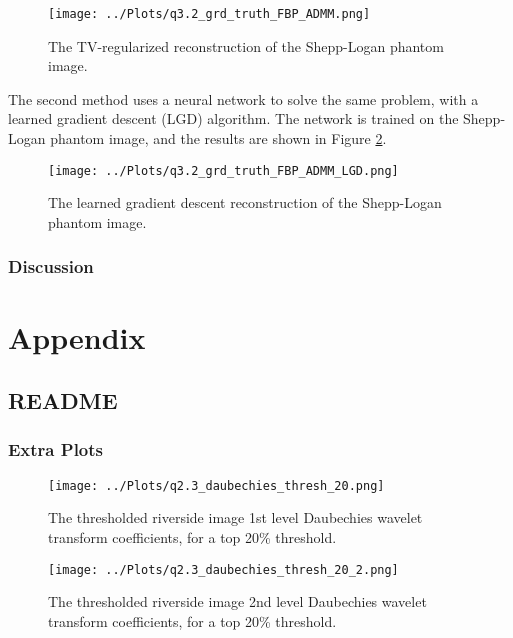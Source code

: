 \documentclass[12pt]{report} %
\begin{document}
\begin{figure}[htbp]
    \centering
    \texttt{[image: ../Plots/q3.2\_grd\_truth\_FBP\_ADMM.png]}
    \caption{The TV-regularized reconstruction of the Shepp-Logan phantom image.}
    \label{fig:tv_reconstruction}
\end{figure}

The second method uses a neural network to solve the same problem, with a learned gradient descent (LGD) algorithm. The network is trained on the Shepp-Logan phantom image, and the results are shown in Figure \ref{fig:learned_reconstruction}.

\begin{figure}[htbp]
    \centering
    \texttt{[image: ../Plots/q3.2\_grd\_truth\_FBP\_ADMM\_LGD.png]}
    \caption{The learned gradient descent reconstruction of the Shepp-Logan phantom image.}
    \label{fig:learned_reconstruction}
\end{figure}


\subsection{Discussion}





\chapter{Appendix}

\section{README}

\subsection{Extra Plots}

\begin{figure}[htbp]
    \centering
    \texttt{[image: ../Plots/q2.3\_daubechies\_thresh\_20.png]}
    \caption{The thresholded riverside image 1st level Daubechies wavelet transform coefficients, for a top 20\% threshold.}
    \label{fig:thresholded_image20}
\end{figure}

\begin{figure}[htbp]
    \centering
    \texttt{[image: ../Plots/q2.3\_daubechies\_thresh\_20\_2.png]}
    \caption{The thresholded riverside image 2nd level Daubechies wavelet transform coefficients, for a top 20\% threshold.}
    \label{fig:thresholded_image20_2}
\end{figure}
\end{document}
